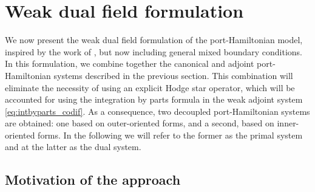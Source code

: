 \documentclass{elsarticle}
\newcommand{\revTwo}[1]{{\color{black}#1}}
\begin{document}
\section{Weak dual field formulation}\label{sec:weak_df}

We now present the weak dual field formulation of the port-Hamiltonian model, inspired by the work of \cite{zhang2021mass}, but now including general mixed boundary conditions. In this formulation, we combine together the canonical and adjoint port-Hamiltonian systems described in the previous section. This combination will eliminate the necessity of using an explicit Hodge star operator, which will be accounted for using the integration by parts formula in the weak adjoint system \eqref{eq:intbyparts_codif}. \revTwo{As a consequence, two decoupled port-Hamiltonian systems are obtained: one based on outer-oriented forms, and a second, based on inner-oriented forms. In the following we will refer to the former as the primal system and at the latter as the dual system.}

\subsection{Motivation of the approach}
\end{document}
